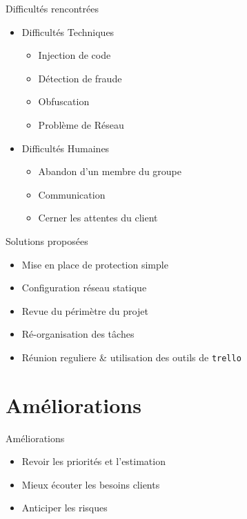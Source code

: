 \documentclass{cubeamer}
\begin{document}
\begin{frame}{Difficultés rencontrées}
    \begin{itemize}
        \item Difficultés Techniques 
              \begin{itemize}
                \item Injection de code
                \item Détection de fraude
                \item Obfuscation
                \item Problème de Réseau
              \end{itemize}
        \item Difficultés Humaines
              \begin{itemize}
                \item Abandon d'un membre du groupe
                \item Communication
                \item Cerner les attentes du client
              \end{itemize}
    \end{itemize}
\end{frame}

\begin{frame}{Solutions proposées}
    \begin{itemize}
        \item Mise en place de protection simple
        \item Configuration réseau statique
        \item Revue du périmètre du projet
        \item Ré-organisation des tâches
        \item Réunion reguliere \& utilisation des outils de \verb:trello:
    \end{itemize}
\end{frame}

\section{Améliorations}

\begin{frame}{Améliorations}
    \begin{itemize}
        \item Revoir les priorités et l'estimation
        \item Mieux écouter les besoins clients
        \item Anticiper les risques
    \end{itemize}
\end{frame}
\end{document}
